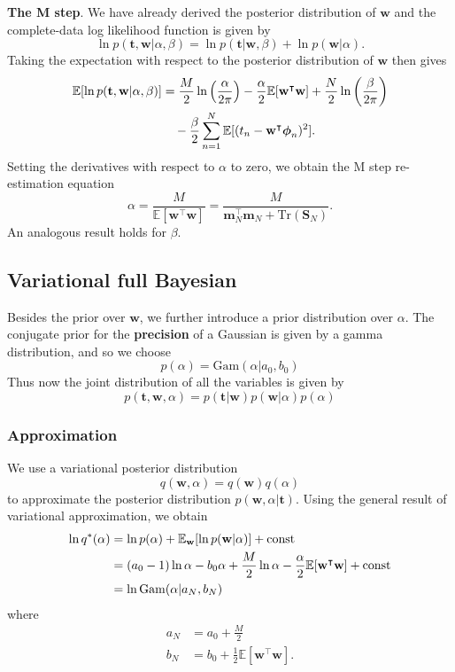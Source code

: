 \documentclass[a4paper]{report}
\newcommand{\up}{\mathrm}
\renewcommand{\bf}{\mathbf}
\newcommand{\bb}{\mathbb}
\newcommand{\bs}{\boldsymbol}
\begin{document}
\textbf{The M step}. We have already derived the posterior distribution of $\bf{w}$ and the complete-data log likelihood function is given by
\begin{equation}
	\ln p(\bf{t,w}|\alpha,\beta) = \ln p(\bf{t|w},\beta) + \ln p(\bf{w}|\alpha).
\end{equation}
Taking the expectation with respect to the posterior distribution of $\bf{w}$ then gives
\begin{align}
	\bb{E}[\ln p(\bf{t,w}|\alpha,\beta)] &= \frac{M}{2} \ln \left( \frac{\alpha}{2\pi} \right) - \frac{\alpha}{2} \bb{E}[\bf{w}^{\intercal} \bf{w}]+\frac{N}{2}\ln \left( \frac{\beta}{2\pi} \right) \notag \\
	&\quad -\frac{\beta}{2}\sum_{n=1}^N \bb{E}[(t_n - \bf{w}^{\intercal} \bs{\phi}_n)^2].
\end{align}
Setting the derivatives with respect to $\alpha$ to zero, we obtain the M step re-estimation equation
\begin{equation}
	\alpha = \frac{M}{\bb{E}[\bf{w}^{\intercal} \bf{w}]} = \frac{M}{\bf{m}_N^{\intercal} \bf{m}_N + \up{Tr}(\bf{S}_N)}.
\end{equation}
An analogous result holds for $\beta$.
\subsection{Variational full Bayesian}
Besides the prior over $\bf{w}$, we further introduce a prior distribution over $\alpha$. The conjugate prior for the \textbf{precision} of a Gaussian is given by a gamma distribution, and so we choose
\begin{equation}
	p(\alpha) = \up{Gam}(\alpha |a_0,b_0)
\end{equation}
Thus now the joint distribution of all the variables is given by
\begin{equation}
	p(\bf{t,w},\alpha) = p(\bf{t|w})p(\bf{w}|\alpha)p(\alpha)
\end{equation}

\subsubsection{Approximation}
We use a variational posterior distribution 
\begin{equation}
	q(\bf{w},\alpha) = q(\bf{w})q(\alpha)
\end{equation}
to approximate the posterior distribution $p(\bf{w},\alpha|\bf{t})$. Using the general result of variational approximation, we obtain
\begin{align}
	\ln q^*(\alpha) &= \ln p(\alpha)+\bb{E}_{\bf{w}}[\ln p(\bf{w}|\alpha)]+\up{const} \notag\\
	&= (a_0-1)\ln \alpha - b_0 \alpha + \frac{M}{2} \ln \alpha - \frac{\alpha}{2}\bb{E}[\bf{w}^{\intercal}\bf{w}]+\up{const} \\
	&= \ln \up{Gam}(\alpha|a_N,b_N)
\end{align}
where
\begin{align}
	a_N &= a_0 + \frac{M}{2} \\
	b_N &= b_0 + \frac{1}{2} \bb{E}[\bf{w}^{\intercal} \bf{w}].
\end{align}
\end{document}
